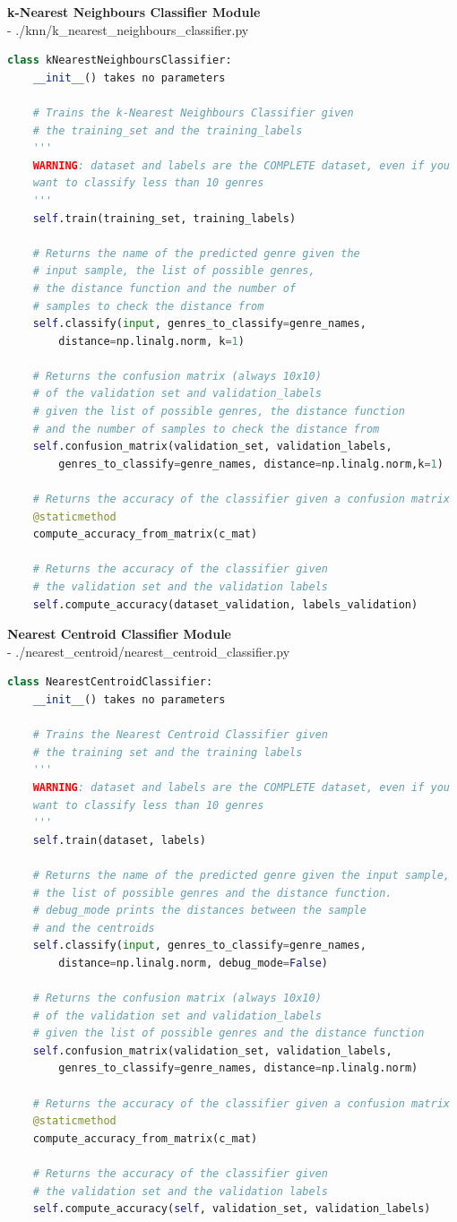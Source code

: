\documentclass[12pt]{article}
\begin{document}
	\textbf{k-Nearest Neighbours Classifier Module}\mbox{}\\
	- ./knn/k\_nearest\_neighbours\_classifier.py
	\begin{lstlisting}[language=Python]
class kNearestNeighboursClassifier:
	__init__() takes no parameters
	
	# Trains the k-Nearest Neighbours Classifier given
	# the training_set and the training_labels
	'''
	WARNING: dataset and labels are the COMPLETE dataset, even if you
	want to classify less than 10 genres
	'''
	self.train(training_set, training_labels)
	
	# Returns the name of the predicted genre given the
	# input sample, the list of possible genres,
	# the distance function and the number of
	# samples to check the distance from
	self.classify(input, genres_to_classify=genre_names, 
		distance=np.linalg.norm, k=1)
	
	# Returns the confusion matrix (always 10x10)
	# of the validation set and validation_labels
	# given the list of possible genres, the distance function
	# and the number of samples to check the distance from
	self.confusion_matrix(validation_set, validation_labels,
		genres_to_classify=genre_names, distance=np.linalg.norm,k=1)
	
	# Returns the accuracy of the classifier given a confusion matrix
	@staticmethod
	compute_accuracy_from_matrix(c_mat)
	
	# Returns the accuracy of the classifier given
	# the validation set and the validation labels
	self.compute_accuracy(dataset_validation, labels_validation)
	\end{lstlisting}
	\newpage
	\textbf{Nearest Centroid Classifier Module}\mbox{}\\
	- ./nearest\_centroid/nearest\_centroid\_classifier.py
	\begin{lstlisting}[language=Python]
class NearestCentroidClassifier:
	__init__() takes no parameters	
	
	# Trains the Nearest Centroid Classifier given
	# the training set and the training labels
	'''
	WARNING: dataset and labels are the COMPLETE dataset, even if you
	want to classify less than 10 genres
	'''
	self.train(dataset, labels)
	
	# Returns the name of the predicted genre given the input sample,
	# the list of possible genres and the distance function.
	# debug_mode prints the distances between the sample 
	# and the centroids
	self.classify(input, genres_to_classify=genre_names,
		distance=np.linalg.norm, debug_mode=False)
	
	# Returns the confusion matrix (always 10x10)
	# of the validation set and validation_labels
	# given the list of possible genres and the distance function
	self.confusion_matrix(validation_set, validation_labels,
		genres_to_classify=genre_names, distance=np.linalg.norm)
	
	# Returns the accuracy of the classifier given a confusion matrix
	@staticmethod
	compute_accuracy_from_matrix(c_mat)
	
	# Returns the accuracy of the classifier given
	# the validation set and the validation labels
	self.compute_accuracy(self, validation_set, validation_labels)
	\end{lstlisting}
\end{document}
